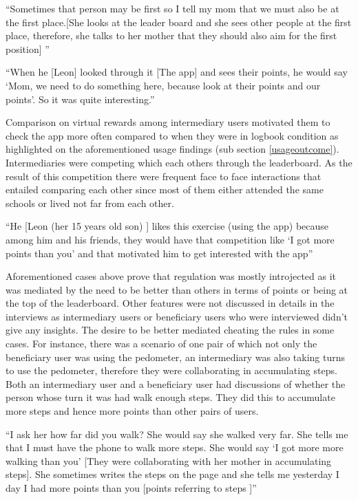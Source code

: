  {``Sometimes that person may be first so I tell my mom that we must also be at the first place.[She looks at the  leader board and she sees other people at the first place, therefore, she talks to her mother that they should also aim for the first position] ''} 

 {``When he [Leon] looked through it [The app] and sees their points, he would say `Mom, we need to do something here, because look at their points and our points'. So it was quite interesting.''} 

Comparison on virtual rewards among intermediary users motivated them to check the app more often compared to when they were in logbook condition as highlighted on the aforementioned usage findings (sub section \ref{usageoutcome}). Intermediaries were competing which each others through the leaderboard. As the result of this competition there were frequent face to face interactions that entailed comparing each other since most of them either attended the same schools or lived not far from each other. 

 {``He [Leon (her 15 years old son) ] likes this exercise (using the app) because among him and his friends, they would have that competition like `I got more points than you' and that motivated him to get interested with the app''} 

Aforementioned cases above prove that regulation was mostly introjected as it was mediated by the need to be better than others in terms of points or being at the top of the leaderboard. Other features were not discussed in details in the interviews as intermediary users or beneficiary users who were interviewed didn't give any insights. The desire to be better mediated cheating the rules in some cases. For instance, there was a scenario of one pair of which not only the beneficiary user was using the pedometer, an intermediary was also taking turns to use the pedometer, therefore they were collaborating in accumulating steps. Both an intermediary user and a beneficiary user had discussions of whether the person whose turn it was had walk enough steps. They did this to accumulate more steps and hence more points than other pairs of users. 

 {``I ask her how far did you walk?  She would say she walked very far. She tells me that I must have the phone to walk more steps. She would say `I got more more walking than you' [They were collaborating with her mother in accumulating steps]. She sometimes writes the steps on the page and she tells me yesterday I day I had more points than you [points referring to steps ]''} 

